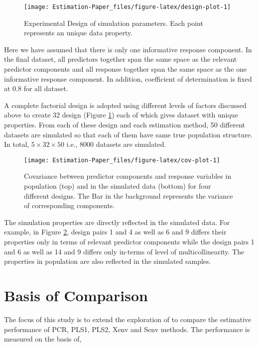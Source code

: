 \documentclass[12pt,3p,authoryear]{elsarticle}
\begin{document}
\begin{figure}
\texttt{[image: Estimation-Paper\_files/figure-latex/design-plot-1]} \caption{Experimental Design of simulation parameters. Each point represents an unique data property.}\label{fig:design-plot}
\end{figure}

Here we have assumed that there is only one informative response component. In the final dataset, all predictors together span the same space as the relevant predictor components and all response together span the same space as the one informative response component. In addition, coefficient of determination is fixed at 0.8 for all dataset.

A complete factorial design is adopted using different levels of factors discussed above to create 32 design (Figure \ref{fig:design-plot}) each of which gives dataset with unique properties. From each of these design and each estimation method, 50 different datasets are simulated so that each of them have same true population structure. In total, \(5 \times 32 \times 50\) i.e., 8000 datasets are simulated.



\begin{figure}
\texttt{[image: Estimation-Paper\_files/figure-latex/cov-plot-1]} \caption{Covariance between predictor components and response variables in population (top) and in the simulated data (bottom) for four different designs. The Bar in the background represents the variance of corresponding components.}\label{fig:cov-plot}
\end{figure}

The simulation properties are directly reflected in the simulated data. For example, in Figure \ref{fig:cov-plot}, design pairs 1 and 4 as well as 6 and 9 differs their properties only in terms of relevant predictor components while the design pairs 1 and 6 as well as 14 and 9 differs only in-terms of level of multicollinearity. The properties in population are also reflected in the simulated samples.

\hypertarget{basis-of-comparison}{%
\section{Basis of Comparison}\label{basis-of-comparison}}

The focus of this study is to extend the exploration of \citet{rimal2019pred} to compare the estimative performance of PCR, PLS1, PLS2, Xenv and Senv methods. The performance is measured on the basis of,
\end{document}

